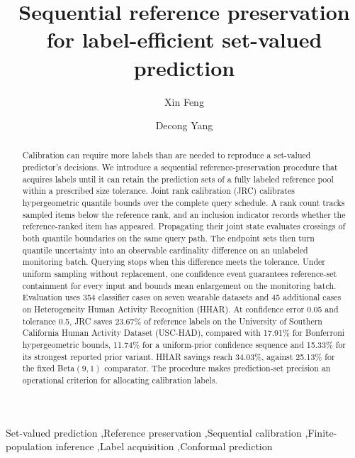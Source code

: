 \documentclass[preprint,12pt]{elsarticle}
\begin{document}
\begin{frontmatter}
\title{Sequential reference preservation for label-efficient set-valued prediction}
\author[aff1]{Xin Feng}
\author[aff1]{Decong Yang}
\begin{abstract}
Calibration can require more labels than are needed to reproduce a set-valued predictor's decisions. We introduce a sequential reference-preservation procedure that acquires labels until it can retain the prediction sets of a fully labeled reference pool within a prescribed size tolerance. Joint rank calibration (JRC) calibrates hypergeometric quantile bounds over the complete query schedule. A rank count tracks sampled items below the reference rank, and an inclusion indicator records whether the reference-ranked item has appeared. Propagating their joint state evaluates crossings of both quantile boundaries on the same query path. The endpoint sets then turn quantile uncertainty into an observable cardinality difference on an unlabeled monitoring batch. Querying stops when this difference meets the tolerance. Under uniform sampling without replacement, one confidence event guarantees reference-set containment for every input and bounds mean enlargement on the monitoring batch. Evaluation uses 354 classifier cases on seven wearable datasets and 45 additional cases on Heterogeneity Human Activity Recognition (HHAR). At confidence error 0.05 and tolerance 0.5, JRC saves 23.67\% of reference labels on the University of Southern California Human Activity Dataset (USC-HAD), compared with 17.91\% for Bonferroni hypergeometric bounds, 11.74\% for a uniform-prior confidence sequence and 15.33\% for its strongest reported prior variant. HHAR savings reach 34.03\%, against 25.13\% for the fixed Beta$(9,1)$ comparator. The procedure makes prediction-set precision an operational criterion for allocating calibration labels.
\end{abstract}
\begin{keyword}
Set-valued prediction \sep Reference preservation \sep Sequential calibration \sep Finite-population inference \sep Label acquisition \sep Conformal prediction
\end{keyword}
\end{frontmatter}
\end{document}
